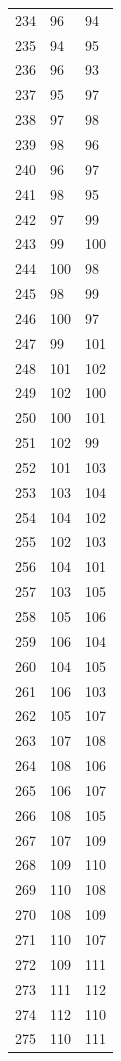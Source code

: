 \documentclass[a4paper,11pt]{article}
\begin{document}
\begin{center}
\begin{longtable}{|R{1.5cm}|R{1.5cm}|R{1.5cm}|}
  234 &   96 &   94 \\
  235 &   94 &   95 \\
  236 &   96 &   93 \\
  237 &   95 &   97 \\
  238 &   97 &   98 \\
  239 &   98 &   96 \\
  240 &   96 &   97 \\
  241 &   98 &   95 \\
  242 &   97 &   99 \\
  243 &   99 &  100 \\
  244 &  100 &   98 \\
  245 &   98 &   99 \\
  246 &  100 &   97 \\
  247 &   99 &  101 \\
  248 &  101 &  102 \\
  249 &  102 &  100 \\
  250 &  100 &  101 \\
  251 &  102 &   99 \\
  252 &  101 &  103 \\
  253 &  103 &  104 \\
  254 &  104 &  102 \\
  255 &  102 &  103 \\
  256 &  104 &  101 \\
  257 &  103 &  105 \\
  258 &  105 &  106 \\
  259 &  106 &  104 \\
  260 &  104 &  105 \\
  261 &  106 &  103 \\
  262 &  105 &  107 \\
  263 &  107 &  108 \\
  264 &  108 &  106 \\
  265 &  106 &  107 \\
  266 &  108 &  105 \\
  267 &  107 &  109 \\
  268 &  109 &  110 \\
  269 &  110 &  108 \\
  270 &  108 &  109 \\
  271 &  110 &  107 \\
  272 &  109 &  111 \\
  273 &  111 &  112 \\
  274 &  112 &  110 \\
  275 &  110 &  111 \\

\end{longtable}
\end{center}
\end{document}
